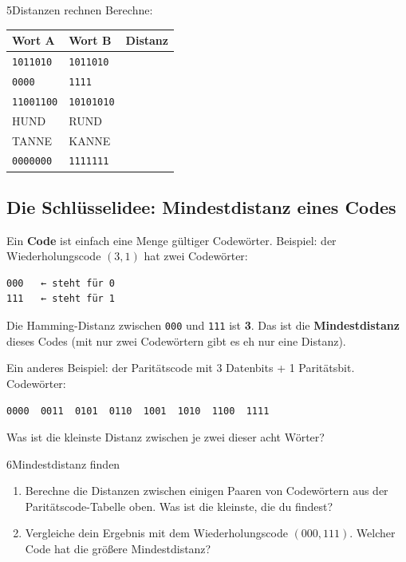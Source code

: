 \begin{bleistiftuebung}{5}{Distanzen rechnen}
Berechne:

\begin{center}
\begin{tabular}{lll}
  \toprule
  Wort A & Wort B & Distanz \\
  \midrule
  \texttt{1011010}  & \texttt{1011010}  & \\
  \texttt{0000}     & \texttt{1111}     & \\
  \texttt{11001100} & \texttt{10101010} & \\
  HUND              & RUND              & \\
  TANNE             & KANNE             & \\
  \texttt{0000000}  & \texttt{1111111}  & \\
  \bottomrule
\end{tabular}
\end{center}
\end{bleistiftuebung}

\subsection*{Die Schlüsselidee: Mindestdistanz eines Codes}

Ein \textbf{Code} ist einfach eine Menge gültiger Codewörter. Beispiel:
der Wiederholungscode $(3,1)$ hat zwei Codewörter:

\begin{verbatim}
000   ← steht für 0
111   ← steht für 1
\end{verbatim}

Die Hamming-Distanz zwischen \texttt{000} und \texttt{111} ist
\textbf{3}. Das ist die \textbf{Mindestdistanz} dieses Codes (mit nur
zwei Codewörtern gibt es eh nur eine Distanz).

Ein anderes Beispiel: der Paritätscode mit 3 Datenbits + 1
Paritätsbit. Codewörter:

\begin{verbatim}
0000  0011  0101  0110  1001  1010  1100  1111
\end{verbatim}

Was ist die kleinste Distanz zwischen je zwei dieser acht Wörter?

\begin{bleistiftuebung}{6}{Mindestdistanz finden}
\begin{enumerate}[label=(\alph*), leftmargin=*]
\item Berechne die Distanzen zwischen einigen Paaren von Codewörtern
  aus der Paritätscode-Tabelle oben. Was ist die kleinste, die du
  findest?
\item Vergleiche dein Ergebnis mit dem Wiederholungscode
  $(000, 111)$. Welcher Code hat die größere Mindestdistanz?
\end{enumerate}
\end{bleistiftuebung}

